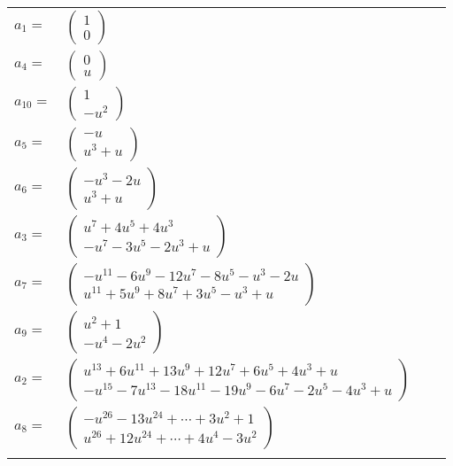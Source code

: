 \documentclass[1p]{elsarticle_modified}
\theoremstyle{definition}
\begin{document}
\begin{tabular}{m{7pt} m{180pt} m{7pt} m{180pt} }
\flushright $a_{1}=$&$\begin{pmatrix}1\\0\end{pmatrix}$ \\
\flushright $a_{4}=$&$\begin{pmatrix}0\\u\end{pmatrix}$ \\
\flushright $a_{10}=$&$\begin{pmatrix}1\\- u^2\end{pmatrix}$ \\
\flushright $a_{5}=$&$\begin{pmatrix}- u\\u^3+u\end{pmatrix}$ \\
\flushright $a_{6}=$&$\begin{pmatrix}- u^3-2 u\\u^3+u\end{pmatrix}$ \\
\flushright $a_{3}=$&$\begin{pmatrix}u^7+4 u^5+4 u^3\\- u^7-3 u^5-2 u^3+u\end{pmatrix}$ \\
\flushright $a_{7}=$&$\begin{pmatrix}- u^{11}-6 u^9-12 u^7-8 u^5- u^3-2 u\\u^{11}+5 u^9+8 u^7+3 u^5- u^3+u\end{pmatrix}$ \\
\flushright $a_{9}=$&$\begin{pmatrix}u^2+1\\- u^4-2 u^2\end{pmatrix}$ \\
\flushright $a_{2}=$&$\begin{pmatrix}u^{13}+6 u^{11}+13 u^9+12 u^7+6 u^5+4 u^3+u\\- u^{15}-7 u^{13}-18 u^{11}-19 u^9-6 u^7-2 u^5-4 u^3+u\end{pmatrix}$ \\
\flushright $a_{8}=$&$\begin{pmatrix}- u^{26}-13 u^{24}+\cdots+3 u^2+1\\u^{26}+12 u^{24}+\cdots+4 u^4-3 u^2\end{pmatrix}$\\&\end{tabular}
\end{document}
